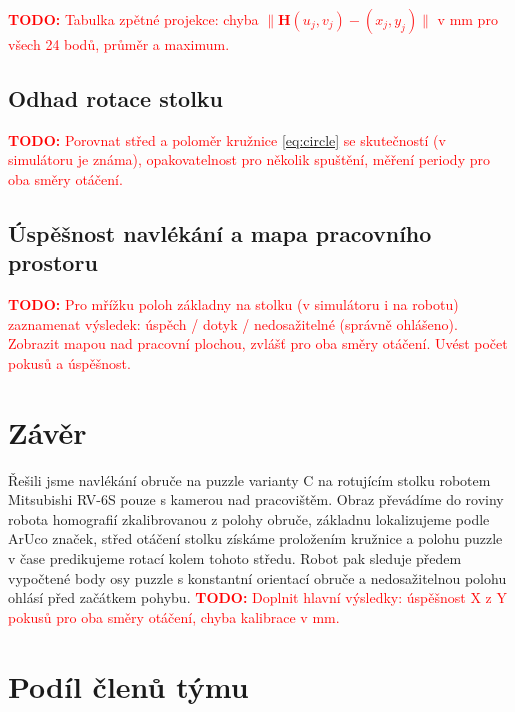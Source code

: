 \documentclass[11pt,a4paper]{article}
\newcommand{\todo}[1]{\textcolor{red}{\textbf{TODO:} #1}}
\begin{document}
\todo{Tabulka zpětné projekce: chyba $\|\mathbf{H}(u_j,v_j) - (x_j,y_j)\|$ v mm
pro všech 24 bodů, průměr a maximum.}

\vspace{4cm}

\subsection{Odhad rotace stolku}
\label{sec:exp_rotace}

\todo{Porovnat střed a poloměr kružnice \eqref{eq:circle} se skutečností
(v simulátoru je známa), opakovatelnost pro několik spuštění, měření periody
pro oba směry otáčení.}

\vspace{4cm}

\subsection{Úspěšnost navlékání a mapa pracovního prostoru}
\label{sec:exp_mapa}

\todo{Pro mřížku poloh základny na stolku (v simulátoru i na robotu) zaznamenat
výsledek: úspěch / dotyk / nedosažitelné (správně ohlášeno). Zobrazit mapou nad
pracovní plochou, zvlášť pro oba směry otáčení. Uvést počet pokusů a úspěšnost.}

\vspace{6cm}

\section{Závěr}
\label{sec:zaver}

Řešili jsme navlékání obruče na puzzle varianty C na rotujícím stolku robotem
Mitsubishi RV-6S pouze s kamerou nad pracovištěm. Obraz převádíme do roviny
robota homografií zkalibrovanou z polohy obruče, základnu lokalizujeme
podle ArUco značek, střed otáčení stolku získáme proložením kružnice a polohu
puzzle v čase predikujeme rotací kolem tohoto středu. Robot pak sleduje
předem vypočtené body osy puzzle s konstantní orientací obruče
a nedosažitelnou polohu ohlásí před začátkem pohybu.
\todo{Doplnit hlavní výsledky: úspěšnost X z Y pokusů pro oba směry otáčení,
chyba kalibrace v mm.}

\section{Podíl členů týmu}
\label{sec:podil}
\end{document}
